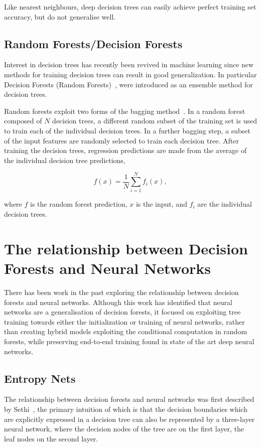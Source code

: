 \documentclass[thesis]{subfiles}
\begin{document}
Like nearest neighbours, deep decision trees can easily achieve perfect training set accuracy, but do not generalise well. 

\subsection{Random Forests/Decision Forests}
Interest in decision trees has recently been revived in machine learning since new methods for training decision trees can result in good generalization. In particular Decision Forests (Random Forests)~\citep{journals/neco/AmitG97,breiman2001random}, were introduced as an ensemble method for decision trees.

Random forests exploit two forms of the bagging method~\citep{breiman1996bagging}. In a random forest composed of $N$ decision trees, a different random subset of the training set is used to train each of the individual decision trees. In a further bagging step, a subset of the input features are randomly selected to train each decision tree. After training the decision trees, regression predictions are made from the average of the individual decision tree predictions,

\begin{equation}
	f(x) = \frac{1}{N} \sum_{i=1}^{N} f_i(x),
\end{equation}

where $f$ is the random forest prediction, $x$ is the input, and $f_i$ are the individual decision trees.

\section{The relationship between Decision Forests and Neural Networks}
There has been work in the past exploring the relationship between decision forests and neural networks. Although this work has identified that neural networks are a generalisation of decision forests, it focused on exploiting tree training towards either the initialization or training of neural networks, rather than creating hybrid models exploiting the conditional computation in random forests, while preserving end-to-end training found in state of the art deep neural networks.


\subsection{Entropy Nets}
The relationship between decision forests and neural networks was first described by Sethi~\citep{Sethi1990}, the primary intuition of which is that the decision boundaries which are explicitly expressed in a decision tree can also be represented by a three-layer neural network, where the decision nodes of the tree are on the first layer, the leaf nodes on the second layer.
\end{document}
